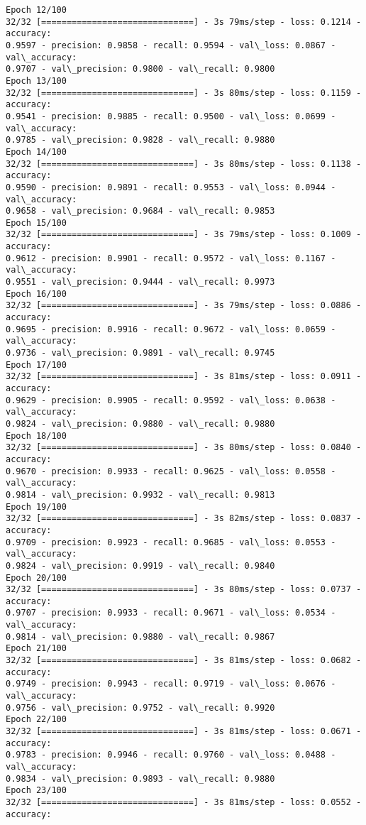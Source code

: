 \documentclass[11pt]{article}
\begin{document}
\begin{Verbatim}[commandchars=\\\{\}]
Epoch 12/100
32/32 [==============================] - 3s 79ms/step - loss: 0.1214 - accuracy:
0.9597 - precision: 0.9858 - recall: 0.9594 - val\_loss: 0.0867 - val\_accuracy:
0.9707 - val\_precision: 0.9800 - val\_recall: 0.9800
Epoch 13/100
32/32 [==============================] - 3s 80ms/step - loss: 0.1159 - accuracy:
0.9541 - precision: 0.9885 - recall: 0.9500 - val\_loss: 0.0699 - val\_accuracy:
0.9785 - val\_precision: 0.9828 - val\_recall: 0.9880
Epoch 14/100
32/32 [==============================] - 3s 80ms/step - loss: 0.1138 - accuracy:
0.9590 - precision: 0.9891 - recall: 0.9553 - val\_loss: 0.0944 - val\_accuracy:
0.9658 - val\_precision: 0.9684 - val\_recall: 0.9853
Epoch 15/100
32/32 [==============================] - 3s 79ms/step - loss: 0.1009 - accuracy:
0.9612 - precision: 0.9901 - recall: 0.9572 - val\_loss: 0.1167 - val\_accuracy:
0.9551 - val\_precision: 0.9444 - val\_recall: 0.9973
Epoch 16/100
32/32 [==============================] - 3s 79ms/step - loss: 0.0886 - accuracy:
0.9695 - precision: 0.9916 - recall: 0.9672 - val\_loss: 0.0659 - val\_accuracy:
0.9736 - val\_precision: 0.9891 - val\_recall: 0.9745
Epoch 17/100
32/32 [==============================] - 3s 81ms/step - loss: 0.0911 - accuracy:
0.9629 - precision: 0.9905 - recall: 0.9592 - val\_loss: 0.0638 - val\_accuracy:
0.9824 - val\_precision: 0.9880 - val\_recall: 0.9880
Epoch 18/100
32/32 [==============================] - 3s 80ms/step - loss: 0.0840 - accuracy:
0.9670 - precision: 0.9933 - recall: 0.9625 - val\_loss: 0.0558 - val\_accuracy:
0.9814 - val\_precision: 0.9932 - val\_recall: 0.9813
Epoch 19/100
32/32 [==============================] - 3s 82ms/step - loss: 0.0837 - accuracy:
0.9709 - precision: 0.9923 - recall: 0.9685 - val\_loss: 0.0553 - val\_accuracy:
0.9824 - val\_precision: 0.9919 - val\_recall: 0.9840
Epoch 20/100
32/32 [==============================] - 3s 80ms/step - loss: 0.0737 - accuracy:
0.9707 - precision: 0.9933 - recall: 0.9671 - val\_loss: 0.0534 - val\_accuracy:
0.9814 - val\_precision: 0.9880 - val\_recall: 0.9867
Epoch 21/100
32/32 [==============================] - 3s 81ms/step - loss: 0.0682 - accuracy:
0.9749 - precision: 0.9943 - recall: 0.9719 - val\_loss: 0.0676 - val\_accuracy:
0.9756 - val\_precision: 0.9752 - val\_recall: 0.9920
Epoch 22/100
32/32 [==============================] - 3s 81ms/step - loss: 0.0671 - accuracy:
0.9783 - precision: 0.9946 - recall: 0.9760 - val\_loss: 0.0488 - val\_accuracy:
0.9834 - val\_precision: 0.9893 - val\_recall: 0.9880
Epoch 23/100
32/32 [==============================] - 3s 81ms/step - loss: 0.0552 - accuracy:

\end{Verbatim}
\end{document}
